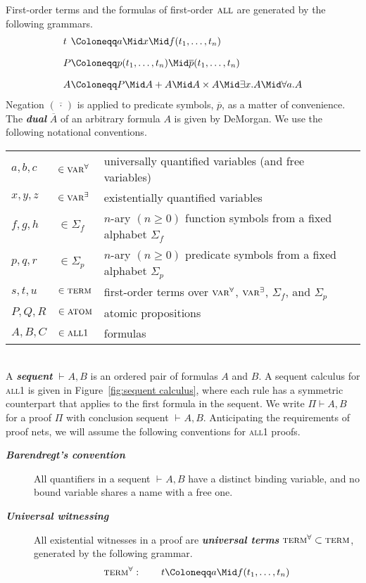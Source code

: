 \documentclass{article}
\theoremstyle{definition}
\theoremstyle{plain}
\newcommand\defn[1]{\textit{\textbf{#1}}}
\newcommand\varA{\textsc{var}^\forall}
\newcommand\varE{\textsc{var}^\exists}
\newcommand\terms{\textsc{term}}
\newcommand\termsA{\textsc{term}^\forall}
\newcommand\atom{\textsc{atom}}
\newcommand\all{\textsc{all}}
\newcommand\+{+}
\renewcommand\*{\times}
\newcommand\dual[1]{\overline{#1}}
\newcommand\seq[3][]{{\vdash_{#1}}#2,#3}
\newcommand\prf[3]{#1\vdash\!#2,#3}
\begin{document}
First-order terms and the formulas of first-order $\all$ are generated by the following grammars.
%
\setMidspace{5pt}
\[
\begin{array}{l@{}l}
	t &\Coloneqq a \Mid x \Mid f(t_1,\dots,t_n)
\\[10pt]
	P &\Coloneqq p(t_1,\dots,t_n) \Mid \dual p(t_1,\dots,t_n)
\\[10pt]
	A &\Coloneqq P \Mid A\+A \Mid A\*A \Mid \exists x.A \Mid \forall a.A
\end{array}
\]
%
Negation $(\dual{\,\cdot\,})$ is applied to predicate symbols, $\dual p$, as a matter of convenience. The \defn{dual} $\dual A$ of an arbitrary formula $A$ is given by DeMorgan. We use the following notational conventions.
%
\\[2\itemsep]
%
\begin{tabular}{@{}lll@{}}
	$a,b,c$ & $\in \varA$ 		& universally quantified variables (and free variables)\\
	$x,y,z$ & $\in \varE$		& existentially quantified variables \\
	$f,g,h$ & $\in \Sigma_f$	& $n$-ary $(n\geq 0)$ function symbols from a fixed alphabet $\Sigma_f$\\
	$p,q,r$ & $\in \Sigma_p$	& $n$-ary $(n\geq 0)$ predicate symbols from a fixed alphabet $\Sigma_p$ \\
	$s,t,u$ & $\in \terms$ 		& first-order terms over $\varA$, $\varE$, $\Sigma_f$, and $\Sigma_p$ \\
	$P,Q,R$ & $\in \atom$		& atomic propositions \\
	$A,B,C$ & $\in \all1$		& formulas \\
\end{tabular}
%
\\[2\itemsep]
%
A \defn{sequent} $\seq AB$ is an ordered pair of formulas $A$ and $B$. A sequent calculus for \all1 is given in Figure~\ref{fig:sequent calculus}, where each rule has a symmetric counterpart that applies to the first formula in the sequent. We write $\prf\Pi AB$ for a proof $\Pi$ with conclusion sequent $\seq AB$. Anticipating the requirements of proof nets, we will assume the following conventions for \all1 proofs.

\begin{description}
	\item
[\defn{Barendregt's convention}] All quantifiers in a sequent $\seq AB$ have a distinct binding variable, and no bound variable shares a name with a free one.
	\item
[\defn{Universal witnessing}] All existential witnesses in a proof are \defn{universal terms} $\termsA\subset\terms$, generated by the following grammar.
\[
	\termsA: \qquad t \Coloneqq a \Mid f(t_1,\dots,t_n)
\]
\end{description}
\end{document}
